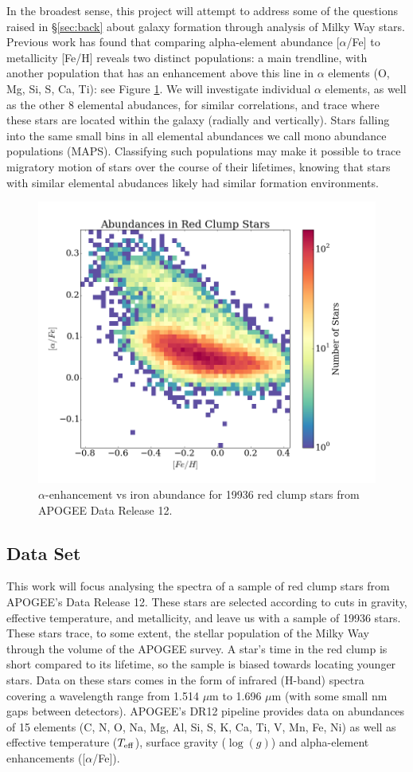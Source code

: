 \documentclass[manuscript]{aastex}
\begin{document}
In the broadest sense, this project will attempt to address some of the questions raised in \S\ref{sec:back} about galaxy formation through analysis of Milky Way stars. Previous work \citep{bovy2015} has found that comparing alpha-element abundance [$\alpha$/Fe] to metallicity [Fe/H] reveals two distinct populations: a main trendline, with another population that has an enhancement above this line in $\alpha$ elements (O, Mg, Si, S, Ca, Ti): see Figure \ref{fig:abun}. We will investigate individual $\alpha$ elements, as well as the other 8 elemental abudances, for similar correlations, and trace where these stars are located within the galaxy (radially and vertically). Stars falling into the same small bins in all elemental abundances we call mono abundance populations (MAPS). Classifying such populations may make it possible to trace migratory motion of stars over the course of their lifetimes, knowing that stars with similar elemental abudances likely had similar formation environments.

\begin{figure}%
\centering
\includegraphics[width = 0.8\linewidth]{alpha_vs_fe.png}
\caption{$\alpha$-enhancement vs iron abundance for 19936 red clump stars from APOGEE Data Release 12.}
\label{fig:abun}
\end{figure}

\subsection{Data Set}
\label{sec:data}
This work will focus analysing the spectra of a sample of red clump stars from APOGEE's Data Release 12. These stars are selected according to cuts in gravity, effective temperature, and metallicity, and leave us with a sample of 19936 stars. These stars trace, to some extent, the stellar population of the Milky Way through the volume of the APOGEE survey. A star's time in the red clump is short compared to its lifetime, so the sample is biased towards locating younger stars. Data on these stars comes in the form of infrared (H-band) spectra covering a wavelength range from 1.514 $\mu$m to 1.696 $\mu$m (with some small nm gaps between detectors). APOGEE's DR12 pipeline provides data on abundances of 15 elements (C, N, O, Na, Mg, Al, Si, S, K, Ca, Ti, V, Mn, Fe, Ni) as well as effective temperature ($T_{\rm eff}$), surface gravity ($\log(g)$) and alpha-element enhancements ([$\alpha$/Fe]).
\end{document}
